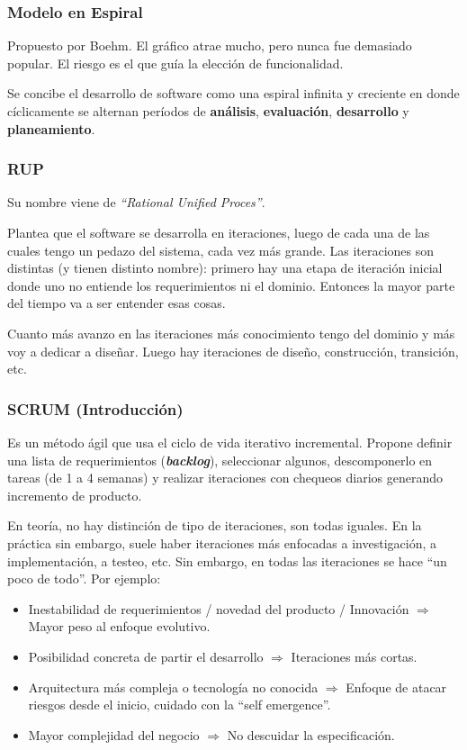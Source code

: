 \documentclass[]{article}
\begin{document}
\subsubsection{Modelo en Espiral}
Propuesto por Boehm. El gráfico atrae mucho, pero nunca fue demasiado popular. El riesgo es el que guía la elección de funcionalidad.



Se concibe el desarrollo de software como una espiral infinita y creciente en donde cíclicamente se alternan períodos de \textbf{análisis}, \textbf{evaluación}, \textbf{desarrollo} y \textbf{planeamiento}.

\subsubsection{RUP}


Su nombre viene de \emph{``Rational Unified Proces''}.

Plantea que el software se desarrolla en iteraciones, luego de cada una de las cuales tengo un pedazo del sistema, cada vez más grande. Las iteraciones son distintas (y tienen distinto nombre): primero hay una etapa de iteración inicial donde uno no entiende los requerimientos ni el dominio. Entonces la mayor parte del tiempo va a ser entender esas cosas.

Cuanto más avanzo en las iteraciones más conocimiento tengo del dominio y más voy a dedicar a diseñar. Luego hay iteraciones de diseño, construcción, transición, etc.

\subsubsection{SCRUM (Introducción)}\label{scrum_intro}
Es un método ágil que usa el ciclo de vida iterativo incremental. Propone definir una lista de requerimientos (\textbf{\emph{backlog}}), seleccionar algunos, descomponerlo en tareas (de 1 a 4 semanas) y realizar iteraciones con chequeos diarios generando incremento de producto.

En teoría, no hay distinción de tipo de iteraciones, son todas iguales. En la práctica sin embargo, suele haber iteraciones más enfocadas a investigación, a implementación, a testeo, etc. Sin embargo, en todas las iteraciones se hace ``un poco de todo''. Por ejemplo:
\begin{itemize}
	\item Inestabilidad de requerimientos / novedad del producto / Innovación $\Rightarrow$ Mayor peso al enfoque evolutivo.
	\item Posibilidad concreta de partir el desarrollo $\Rightarrow$ Iteraciones más cortas.
	\item Arquitectura más compleja o tecnología no conocida $\Rightarrow$ Enfoque de atacar riesgos desde el inicio, cuidado con la ``self emergence''.
	\item Mayor complejidad del negocio $\Rightarrow$ No descuidar la especificación.
\end{itemize}
\end{document}
